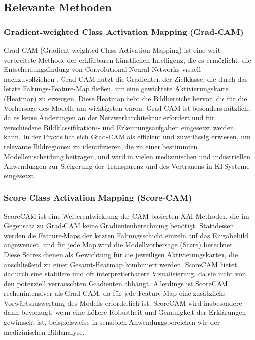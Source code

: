     \subsection{Relevante Methoden} %
        \subsubsection{Gradient-weighted Class Activation Mapping (Grad-CAM)}
            Grad-CAM (Gradient-weighted Class Activation Mapping) ist eine weit verbreitete Methode der erklärbaren künstlichen Intelligenz, die es ermöglicht, die Entscheidungsfindung von Convolutional Neural Networks visuell nachzuvollziehen \cite{Selvaraju_2019}.
            Grad-CAM nutzt die Gradienten der Zielklasse, die durch das letzte Faltungs-Feature-Map flie{\ss}en, um eine gewichtete Aktivierungskarte (Heatmap) zu erzeugen. Diese Heatmap hebt die Bildbereiche hervor, die für die Vorhersage des Modells am wichtigsten waren. 
            Grad-CAM ist besonders nützlich, da es keine Änderungen an der Netzwerkarchitektur erfordert und für verschiedene Bildklassifikations- und Erkennungsaufgaben eingesetzt werden kann. 
            In der Praxis hat sich Grad-CAM als effizient und zuverlässig erwiesen, um relevante Bildregionen zu identifizieren, die zu einer bestimmten Modellentscheidung beitragen, und wird in vielen medizinischen und industriellen Anwendungen zur Steigerung der Transparenz und des Vertrauens in KI-Systeme eingesetzt.
        
        \subsubsection{Score Class Activation Mapping (Score-CAM)}
        \label{scoreCam_beschreibung}
            ScoreCAM ist eine Weiterentwicklung der CAM-basierten XAI-Methoden, die im Gegensatz zu Grad-CAM keine Gradientenberechnung benötigt. 
            Stattdessen werden die Feature-Maps der letzten Faltungsschicht einzeln auf das Eingabebild angewendet, und für jede Map wird die Modellvorhersage (Score) berechnet \cite{wang2020scorecamscoreweightedvisualexplanations}. 
            Diese Scores dienen als Gewichtung für die jeweiligen Aktivierungskarten, die anschlie{\ss}end zu einer Gesamt-Heatmap kombiniert werden. 
            ScoreCAM bietet dadurch eine stabilere und oft interpretierbarere Visualisierung, da sie nicht von den potenziell verrauschten Gradienten abhängt. 
            Allerdings ist ScoreCAM rechenintensiver als Grad-CAM, da für jede Feature-Map eine zusätzliche Vorwärtsauswertung des Modells erforderlich ist. 
            ScoreCAM wird insbesondere dann bevorzugt, wenn eine höhere Robustheit und Genauigkeit der Erklärungen gewünscht ist, beispielsweise in sensiblen Anwendungsbereichen wie der medizinischen Bildanalyse.
        
